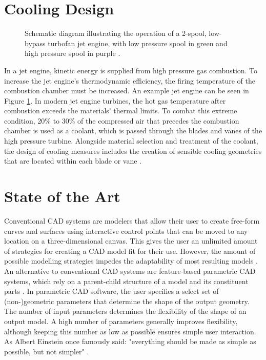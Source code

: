 \documentclass[a4paper, 11pt]{report}
\theoremstyle{definition}
\begin{document}
	\section{Cooling Design}
		\begin{figure}[H]
			\centering
			
			\caption{Schematic diagram illustrating the operation of a 2-spool, low-bypass turbofan jet engine, with low pressure spool in green and high pressure spool in purple \cite{Aainsqatsi2008}.}
			\label{fig:turbofan_schematic}
		\end{figure}

		In a jet engine, kinetic energy is supplied from high pressure gas combustion. To increase the jet engine's thermodynamic efficiency, the firing temperature of the combustion chamber must be increased. An example jet engine can be seen in Figure \ref{fig:turbofan_schematic}. In modern jet engine turbines, the hot gas temperature after combustion exceeds the materials' thermal limits. To combat this extreme condition, 20\% to 30\% of the compressed air that precedes the combustion chamber is used as a coolant, which is passed through the blades and vanes of the high pressure turbine. Alongside material selection and treatment of the coolant, the design of cooling measures includes the creation of sensible cooling geometries that are located within each blade or vane \cite{Giampaolo2020}.

	\section{State of the Art}
		Conventional CAD systems are modelers that allow their user to create free-form curves and surfaces using interactive control points that can be moved to any location on a three-dimensional canvas. This gives the user an unlimited amount of strategies for creating a CAD model fit for their use. However, the amount of possible modelling strategies impedes the adaptability of most resulting models \cite{Camba2016}. An alternative to conventional CAD systems are feature-based parametric CAD systems, which rely on a parent-child structure of a model and its constituent parts \cite{Shah1995}. In parametric CAD software, the user specifies a select set of (non-)geometric parameters that determine the shape of the output geometry. The number of input parameters determines the flexibility of the shape of an output model. A high number of parameters generally improves flexibility, although keeping this number as low as possible ensures simple user interaction. As Albert Einstein once famously said: "everything should be made as simple as possible, but not simpler" \cite{Einstein2013}. 
\end{document}
